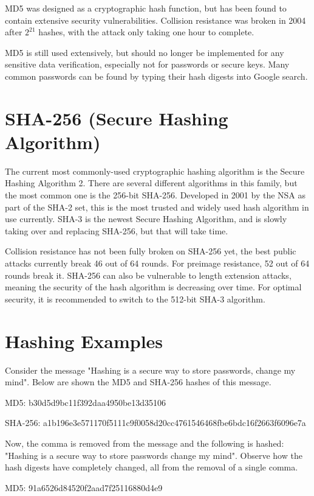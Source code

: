 \documentclass{article}
\begin{document}
MD5 was designed as a cryptographic hash function, but has been found to contain extensive security vulnerabilities. Collision resistance was broken in 2004 after $2^{21}$ hashes, with the attack only taking one hour to complete. 

MD5 is still used extensively, but should no longer be implemented for any sensitive data verification, especially not for passwords or secure keys. Many common passwords can be found by typing their hash digests into Google search.


\section{SHA-256 (Secure Hashing Algorithm)}
\tab The current most commonly-used cryptographic hashing algorithm is the Secure Hashing Algorithm 2. There are several different algorithms in this family, but the most common one is the 256-bit SHA-256. Developed in 2001 by the NSA as part of the SHA-2 set, this is the most trusted and widely used hash algorithm in use currently. SHA-3 is the newest Secure Hashing Algorithm, and is slowly taking over and replacing SHA-256, but that will take time.

Collision resistance has not been fully broken on SHA-256 yet, the best public attacks currently break 46 out of 64 rounds. For preimage resistance, 52 out of 64 rounds break it. SHA-256 can also be vulnerable to length extension attacks, meaning the security of the hash algorithm is decreasing over time. For optimal security, it is recommended to switch to the 512-bit SHA-3 algorithm. 


\section{Hashing Examples}

\tab Consider the message "Hashing is a secure way to store passwords, change my mind". Below are shown the MD5 and SHA-256 hashes of this message.

MD5: b30d5d9bc11f392daa4950be13d35106

SHA-256: a1b196e3e571170f5111c9f0058d20cc4761546468fbe6bdc16f2663f6096e7a

Now, the comma is removed from the message and the following is hashed: "Hashing is a secure way to store passwords change my mind". Observe how the hash digests have completely changed, all from the removal of a single comma.

MD5: 91a6526d84520f2aad7f25116880d4e9
\end{document}
